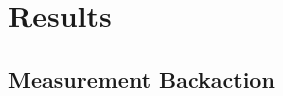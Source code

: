 \documentclass[10pt,
 amsmath,amssymb,
 aps,prb, twocolumn
]{revtex4-2}
\begin{document}
\begin{itemize}
    
\end{itemize}


\section{Results}\label{sect:Results}

\subsection{Measurement Backaction}\label{sect:backaction}
\end{document}
